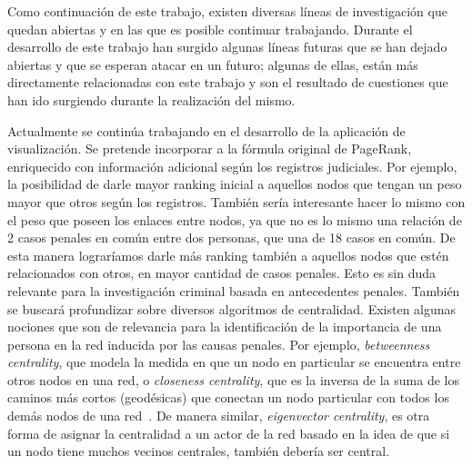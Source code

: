 Como continuación de este trabajo, existen diversas líneas de investigación que quedan abiertas y en las que es posible continuar trabajando. Durante el desarrollo de este trabajo han surgido algunas líneas futuras que se han dejado abiertas y que se esperan atacar en un futuro; algunas de ellas, están más directamente relacionadas con este trabajo y son el resultado de cuestiones que han ido surgiendo durante la realización del mismo.

Actualmente se 	continúa trabajando en el desarrollo de la aplicación de visualización. Se pretende incorporar a la fórmula original de PageRank, enriquecido con información adicional según los registros judiciales. Por ejemplo, la posibilidad de darle mayor ranking inicial a aquellos nodos que tengan un peso mayor que otros según los registros. También sería interesante hacer lo mismo con el peso que poseen los enlaces entre nodos, ya que no es lo mismo una relación de 2 casos penales en común entre dos personas, que una de 18 casos en común. De esta manera lograríamos darle más ranking también a aquellos nodos que estén relacionados con otros, en mayor cantidad de casos penales. Esto es sin duda relevante para la investigación criminal basada en antecedentes penales.
También se buscará profundizar sobre diversos algoritmos de centralidad. Existen algunas nociones que son de relevancia para la identificación de la importancia de una persona en la red inducida por las causas penales. Por ejemplo, \textit{betweenness centrality}, que modela la medida en que un nodo en particular se encuentra entre otros nodos en una red, o \textit{closeness centrality}, que es la inversa de la suma de los caminos más cortos (geodésicas) que conectan un nodo particular con todos los demás nodos de una red~\cite{newman2005measure}. De manera similar, \textit{eigenvector centrality}, es otra forma de asignar la centralidad a un actor de la red basado en la idea de que si un nodo tiene muchos vecinos centrales, también debería ser central.
 